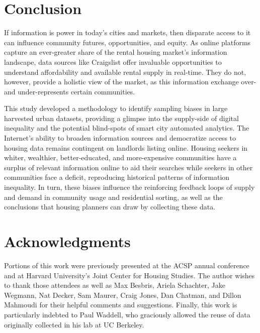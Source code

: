 \documentclass[11pt,letterpaper]{article}
\begin{document}
\section{Conclusion}

If information is power in today's cities and markets, then disparate access to it can influence community futures, opportunities, and equity. As online platforms capture an ever-greater share of the rental housing market's information landscape, data sources like Craigslist offer invaluable opportunities to understand affordability and available rental supply in real-time. They do not, however, provide a holistic view of the market, as this information exchange over- and under-represents certain communities.

This study developed a methodology to identify sampling biases in large harvested urban datasets, providing a glimpse into the supply-side of digital inequality and the potential blind-spots of smart city automated analytics. The Internet's ability to broaden information sources and democratize access to housing data remains contingent on landlords listing online. Housing seekers in whiter, wealthier, better-educated, and more-expensive communities have a surplus of relevant information online to aid their searches while seekers in other communities face a deficit, reproducing historical patterns of information inequality. In turn, these biases influence the reinforcing feedback loops of supply and demand in community usage and residential sorting, as well as the conclusions that housing planners can draw by collecting these data.

\section*{Acknowledgments}

Portions of this work were previously presented at the ACSP annual conference and at Harvard University’s Joint Center for Housing Studies. The author wishes to thank those attendees as well as Max Besbris, Ariela Schachter, Jake Wegmann, Nat Decker, Sam Maurer, Craig Jones, Dan Chatman, and Dillon Mahmoudi for their helpful comments and suggestions. Finally, this work is particularly indebted to Paul Waddell, who graciously allowed the reuse of data originally collected in his lab at UC Berkeley.



\setlength{\bibsep}{0.00cm plus 0.05cm} %

%
\end{document}
